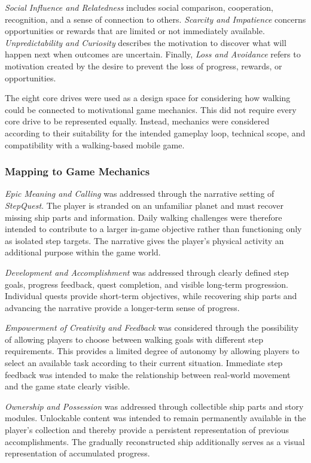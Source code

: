 \textit{Social Influence and Relatedness} includes social comparison, cooperation, recognition, and a sense of connection to others. \textit{Scarcity and Impatience} concerns opportunities or rewards that are limited or not immediately available. \textit{Unpredictability and Curiosity} describes the motivation to discover what will happen next when outcomes are uncertain. Finally, \textit{Loss and Avoidance} refers to motivation created by the desire to prevent the loss of progress, rewards, or opportunities.

The eight core drives were used as a design space for considering how walking could be connected to motivational game mechanics. This did not require every core drive to be represented equally. Instead, mechanics were considered according to their suitability for the intended gameplay loop, technical scope, and compatibility with a walking-based mobile game.

\subsubsection{Mapping to Game Mechanics}

\textit{Epic Meaning and Calling} was addressed through the narrative setting of \textit{StepQuest}. The player is stranded on an unfamiliar planet and must recover missing ship parts and information. Daily walking challenges were therefore intended to contribute to a larger in-game objective rather than functioning only as isolated step targets. The narrative gives the player's physical activity an additional purpose within the game world.

\textit{Development and Accomplishment} was addressed through clearly defined step goals, progress feedback, quest completion, and visible long-term progression. Individual quests provide short-term objectives, while recovering ship parts and advancing the narrative provide a longer-term sense of progress.

\textit{Empowerment of Creativity and Feedback} was considered through the possibility of allowing players to choose between walking goals with different step requirements. This provides a limited degree of autonomy by allowing players to select an available task according to their current situation. Immediate step feedback was intended to make the relationship between real-world movement and the game state clearly visible.

\textit{Ownership and Possession} was addressed through collectible ship parts and story modules. Unlockable content was intended to remain permanently available in the player's collection and thereby provide a persistent representation of previous accomplishments. The gradually reconstructed ship additionally serves as a visual representation of accumulated progress.

